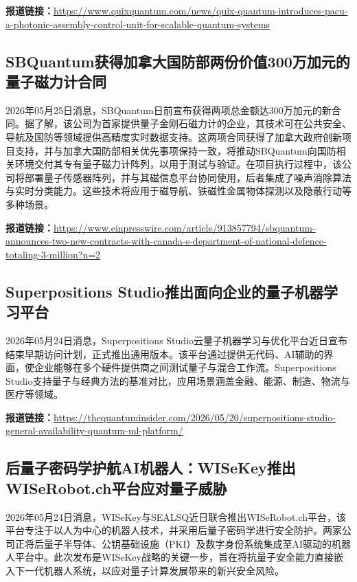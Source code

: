 \documentclass[12pt,a4paper]{ctexart}
\begin{document}
\noindent\textbf{报道链接：}\url{https://www.quixquantum.com/news/quix-quantum-introduces-pacu-a-photonic-assembly-control-unit-for-scalable-quantum-systems}

\subsection{ SBQuantum获得加拿大国防部两份价值300万加元的量子磁力计合同 }

2026年05月25日消息，SBQuantum日前宣布获得两项总金额达300万加元的新合同。据了解，该公司为首家提供量子金刚石磁力计的企业，其技术可在公共安全、导航及国防等领域提供高精度实时数据支持。这两项合同获得了加拿大政府创新项目支持，并与加拿大国防部相关优先事项保持一致，将推动SBQuantum向国防相关环境交付其专有量子磁力计阵列，以用于测试与验证。在项目执行过程中，该公司将部署量子传感器阵列，并与其磁信息平台协同使用，后者集成了噪声消除算法与实时分类能力。这些技术将应用于磁导航、铁磁性金属物体探测以及隐蔽行动等多种场景。

\noindent\textbf{报道链接：}\url{https://www.einpresswire.com/article/913857794/sbquantum-announces-two-new-contracts-with-canada-s-department-of-national-defence-totaling-3-million?n=2}

\subsection{ Superpositions Studio推出面向企业的量子机器学习平台 }

2026年05月24日消息，Superpositions Studio云量子机器学习与优化平台近日宣布结束早期访问计划，正式推出通用版本。该平台通过提供无代码、AI辅助的界面，使企业能够在多个硬件提供商之间测试量子与混合工作流。Superpositions Studio支持量子与经典方法的基准对比，应用场景涵盖金融、能源、制造、物流与医疗等领域。

\noindent\textbf{报道链接：}\url{https://thequantuminsider.com/2026/05/20/superpositions-studio-general-availability-quantum-ml-platform/}

\subsection{ 后量子密码学护航AI机器人：WISeKey推出WISeRobot.ch平台应对量子威胁 }

2026年05月24日消息，WISeKey与SEALSQ近日联合推出WISeRobot.ch平台，该平台专注于以人为中心的机器人技术，并采用后量子密码学进行安全防护。两家公司正将后量子半导体、公钥基础设施（PKI）及数字身份系统集成至AI驱动的机器人平台中。此次发布是WISeKey战略的关键一步，旨在将抗量子安全能力直接嵌入下一代机器人系统，以应对量子计算发展带来的新兴安全风险。
\end{document}
